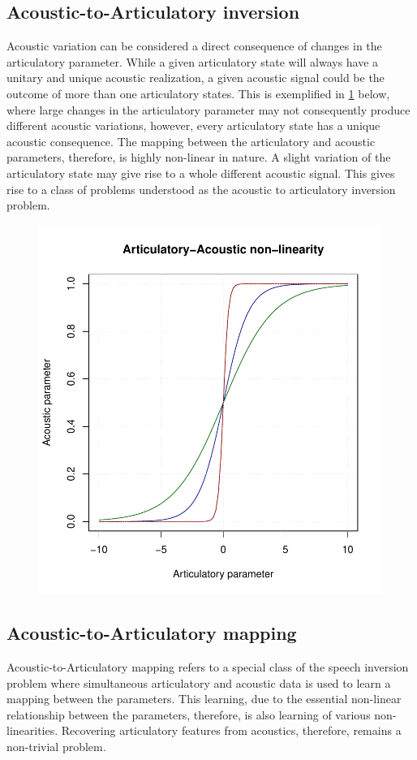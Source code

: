 \documentclass{article}[12pt]
\begin{document}
\subsection{Acoustic-to-Articulatory inversion}
Acoustic variation can be considered a direct consequence of changes in the articulatory parameter. While a given articulatory state will always have a unitary and unique acoustic realization, a given acoustic signal could be the outcome of more than one articulatory states. This is exemplified in \ref{Fig.1} below, where large changes in the articulatory parameter may not consequently produce different acoustic variations, however, every articulatory state has a unique acoustic consequence. The mapping between the articulatory and acoustic parameters, therefore, is highly non-linear in nature. A slight variation of the articulatory state may give rise to a whole different acoustic signal. This gives rise to a class of problems understood as the acoustic to articulatory inversion problem.


\begin{figure}[h]
\includegraphics[scale=0.80]{sigmoid.pdf}
\label{Fig.1}
\end{figure}
\subsection{Acoustic-to-Articulatory mapping}

Acoustic-to-Articulatory mapping refers to a special class of the speech inversion problem where simultaneous articulatory and acoustic data is used to learn a mapping between the parameters. This learning, due to the essential non-linear relationship between the parameters, therefore, is also learning of various non-linearities. Recovering articulatory features from acoustics, therefore, remains a non-trivial problem.
\cite{toutios2003}
\cite{badino2016,canevari2013,cernak2016}


\end{document}
